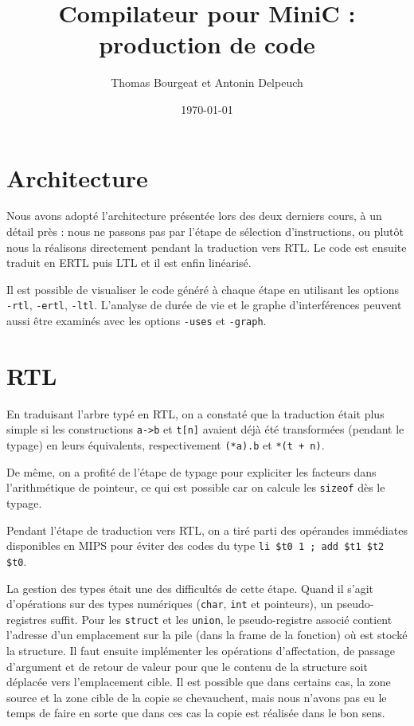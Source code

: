 \documentclass[a4paper]{article}
\begin{document}
\title{Compilateur pour MiniC : production de code}
\author{Thomas Bourgeat et Antonin Delpeuch}
\date{\today}

\maketitle

\section{Architecture}

Nous avons adopté l'architecture présentée lors des deux derniers cours, à un détail près :
nous ne passons pas par l'étape de sélection d'instructions, ou plutôt nous la réalisons
directement pendant la traduction vers RTL. Le code est ensuite traduit en ERTL puis LTL et
il est enfin linéarisé.

Il est possible de visualiser le code généré à chaque étape en utilisant les options
\texttt{-rtl}, \texttt{-ertl}, \texttt{-ltl}. L'analyse de durée de vie et le graphe
d'interférences peuvent aussi être examinés avec les options \texttt{-uses} et \texttt{-graph}.

\section{RTL}

En traduisant l'arbre typé en RTL, on a constaté que la traduction était plus simple si
les constructions \texttt{a->b} et \texttt{t[n]} avaient déjà été transformées (pendant le typage) en leurs équivalents,
respectivement \texttt{(*a).b} et \texttt{*(t + n)}.

De même, on a profité de l'étape de typage pour expliciter les facteurs dans l'arithmétique de pointeur,
ce qui est possible car on calcule les \texttt{sizeof} dès le typage.

Pendant l'étape de traduction vers RTL, on a tiré parti des opérandes immédiates disponibles en MIPS
pour éviter des codes du type \texttt{li  \$t0 1 ; add \$t1 \$t2 \$t0}.

La gestion des types était une des difficultés de cette étape. Quand il s'agit d'opérations sur des types
numériques (\texttt{char}, \texttt{int} et pointeurs), un pseudo-registres suffit. Pour les \texttt{struct}
et les \texttt{union}, le pseudo-registre associé contient l'adresse d'un emplacement sur la pile (dans la
frame de la fonction) où est stocké la structure. Il faut ensuite implémenter les opérations
d'affectation, de passage d'argument et de retour de valeur pour que le contenu de la structure
soit déplacée vers l'emplacement cible. Il est possible que dans certains cas, la zone source et la zone cible
de la copie se chevauchent, mais nous n'avons pas eu le temps de faire en sorte que dans ces cas la copie est réalisée
dans le bon sens.
\end{document}

